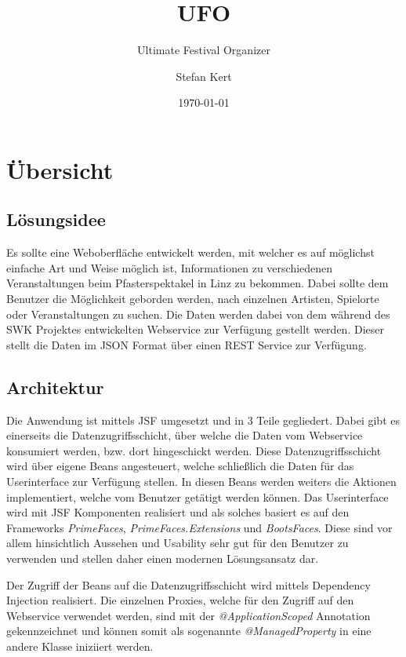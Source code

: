 \documentclass[a4paper,ngerman]{scrartcl}
\begin{document}
\title{UFO}
\subtitle{Ultimate Festival Organizer}
\author{Stefan Kert}
\date{\today}
\maketitle

\section{Übersicht}
\subsection{Lösungsidee}
Es sollte eine Weboberfläche entwickelt werden, mit welcher es auf möglichst einfache Art und Weise möglich ist, Informationen zu
verschiedenen Veranstaltungen beim Pfasterspektakel in Linz zu bekommen. Dabei sollte dem Benutzer die Möglichkeit geborden werden,
nach einzelnen Artisten, Spielorte oder Veranstaltungen zu suchen. Die Daten werden dabei von dem während des SWK Projektes entwickelten
Webservice zur Verfügung gestellt werden. Dieser stellt die Daten im JSON Format über einen REST Service zur Verfügung. 

\subsection{Architektur}
Die Anwendung ist mittels JSF umgesetzt und in 3 Teile gegliedert. Dabei gibt es einerseits die Datenzugriffsschicht, über welche die Daten
vom Webservice konsumiert werden, bzw. dort hingeschickt werden. Diese Datenzugriffsschicht wird über eigene Beans angesteuert, welche schließlich 
die Daten für das Userinterface zur Verfügung stellen. In diesen Beans werden weiters die Aktionen implementiert, welche vom Benutzer getätigt werden können. Das Userinterface wird mit JSF Komponenten realisiert und als solches basiert es auf den Frameworks \textit{PrimeFaces}, \textit{PrimeFaces.Extensions} und \textit{BootsFaces}. Diese sind vor allem hinsichtlich Aussehen und Usability sehr gut für den Benutzer zu verwenden und stellen daher einen modernen Lösungsansatz dar.

Der Zugriff der Beans auf die Datenzugriffsschicht wird mittels Dependency Injection realisiert. Die einzelnen Proxies, welche für den Zugriff auf den Webservice verwendet werden, sind mit der \textit{@ApplicationScoped} Annotation gekennzeichnet und können somit als sogenannte \textit{@ManagedProperty} in eine andere Klasse iniziiert werden. 
\end{document}
